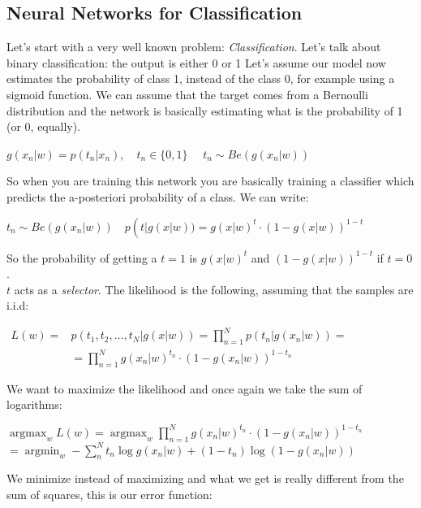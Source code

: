 \subsection{Neural Networks for Classification}
Let's start with a very well known problem: \textit{Classification}. Let's talk about binary classification: the output is either 0 or 1
Let's assume our model now estimates the probability of class 1, instead of the class 0, for example using a sigmoid function. We can assume that the target comes from a Bernoulli distribution and the network is basically estimating what is the probability of 1 (or 0, equally). 
\begin{center}
    $g\left(x_{n} | w\right)=p\left(t_{n} | x_{n}\right), \quad t_{n} \in\{0,1\} \quad$ 
    $t_{n} \sim B e\left(g\left(x_{n} | w\right)\right)$
\end{center}
So when you are training this network you are basically training a classifier which predicts the a-posteriori probability of a class. We can write:
\begin{center}
    $t_{n} \sim B e\left(g\left(x_{n} | w\right)\right) \quad p\left(t|g(x | w))=g(x | w)^{t} \cdot(1-g(x | w))^{1-t}\right.$
\end{center}
So the probability of getting a $t=1$ is $g(x | w)^{t}$ and  $(1-g(x | w))^{1-t}$ if $t=0$. \\
$t$ acts as a \textit{selector}. The likelihood is the following, assuming that the samples are i.i.d:
\begin{center}
    $\begin{aligned} L(w)=& p\left.(t_{1}, t_{2}, \ldots, t_{N}|g(x | w))=\prod_{n=1}^{N} p\left(t_{n}\left|g\left(x_{n} | w\right)\right)=\right.\right.\\ &=\prod_{n=1}^{N} g\left(x_{n} | w\right)^{t_{n}} \cdot\left(1-g\left(x_{n} | w\right)\right)^{1-t_{n}} \end{aligned}$
\end{center}
We want to maximize the likelihood and once again we take the sum of logarithms:
\begin{center}
    $\operatorname{argmax}_{w} L(w)=\operatorname{argmax}_{w} \prod_{n=1}^{N} g\left(x_{n} | w\right)^{t_{n}} \cdot\left(1-g\left(x_{n} | w\right)\right)^{1-t_{n}}$
    $=\operatorname{argmin}_{w}-\sum_{n}^{N} t_{n} \log g\left(x_{n} | w\right)+\left(1-t_{n}\right) \log \left(1-g\left(x_{n} | w\right)\right)$
\end{center}
We minimize instead of maximizing and what we get is really different from the sum of squares, this is our error function:
